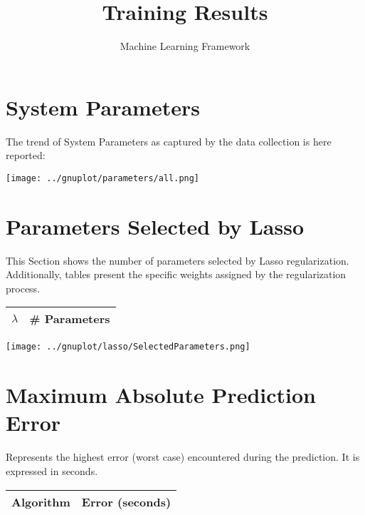 \documentclass[10pt,a4paper]{article}
\title{Training Results}
\author{Machine Learning Framework}
\begin{document}
\maketitle

\section{System Parameters}

The trend of System Parameters as captured by the data collection is here reported:

\begin{center}
\texttt{[image: ../gnuplot/parameters/all.png]}
\end{center}


\section{Parameters Selected by Lasso}

This Section shows the number of parameters selected by Lasso regularization.
Additionally, tables present the specific weights assigned by the regularization process.

\begin{center}
\begin{tabular}{cc}
\toprule
$\lambda$ & \# Parameters \\
\midrule

\bottomrule
\end{tabular}
\end{center}

\begin{center}
\texttt{[image: ../gnuplot/lasso/SelectedParameters.png]}
\end{center}






\section{Maximum Absolute Prediction Error}

Represents the highest error (worst case) encountered during the prediction. It is expressed in seconds.

\begin{center}
\begin{tabular}{cc}
\toprule
\textbf{Algorithm} & \textbf{Error (seconds)} \\
\midrule

\bottomrule
\end{tabular}
\end{center}
\end{document}
